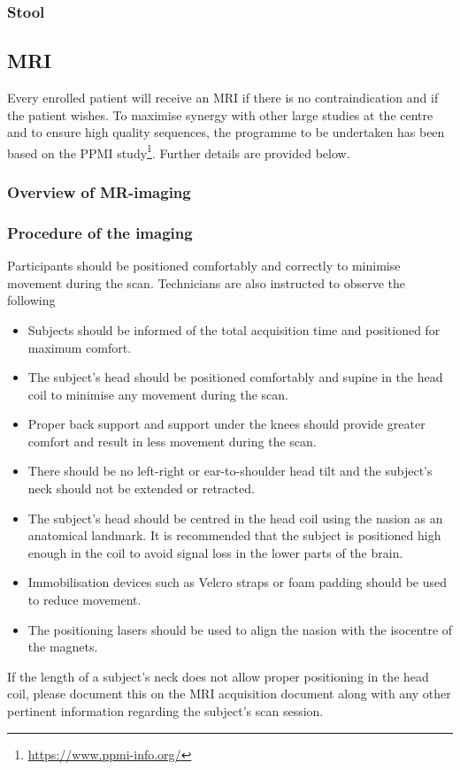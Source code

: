 \subsubsection{Stool}
\label{biosamples:stool}

\subsection{\ac{MRI}}
\label{subsec:MRI}
Every enrolled patient will receive an \ac{MRI} if there is no contraindication and if the patient wishes. To maximise synergy with other large studies at the centre and to ensure high quality sequences, the programme to be undertaken has been based on the PPMI study\footnote{\url{https://www.ppmi-info.org/}}. Further details are provided below.
\subsubsection{Overview of MR-imaging}

\subsubsection{Procedure of the imaging}
Participants should be positioned comfortably and correctly to minimise movement during the scan. Technicians are also instructed to observe the following
\begin{itemize}[noitemsep,topsep=0pt]
\item Subjects should be informed of the total acquisition time and positioned for maximum comfort.
\item The subject's head should be positioned comfortably and supine in the head coil to minimise any movement during the scan.
\item Proper back support and support under the knees should provide greater comfort and result in less movement during the scan.
\item There should be no left-right or ear-to-shoulder head tilt and the subject's neck should not be extended or retracted.
\item The subject's head should be centred in the head coil using the nasion as an anatomical landmark. It is recommended that the subject is positioned high enough in the coil to avoid signal loss in the lower parts of the brain.
\item Immobilisation devices such as Velcro straps or foam padding should be used to reduce movement.
\item The positioning lasers should be used to align the nasion with the isocentre of the magnets.
\end{itemize}
If the length of a subject's neck does not allow proper positioning in the head coil, please document this on the \ac{MRI} acquisition document along with any other pertinent information regarding the subject's scan session.

